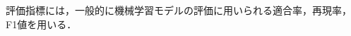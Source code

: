 \documentclass[submit]{ipsj}
\begin{document}
評価指標には，一般的に機械学習モデルの評価に用いられる適合率，再現率，F1値を用いる．










\end{document}
